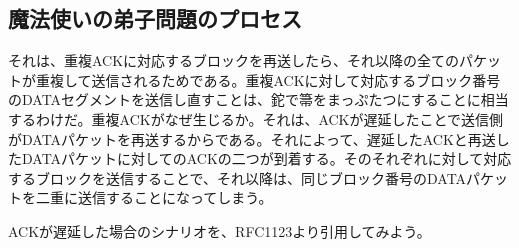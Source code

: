 \subsection{魔法使いの弟子問題のプロセス}

それは、重複ACKに対応するブロックを再送したら、それ以降の全てのパケットが重複して送信されるためである。重複ACKに対して対応するブロック番号のDATAセグメントを送信し直すことは、鉈で箒をまっぷたつにすることに相当するわけだ。重複ACKがなぜ生じるか。それは、ACKが遅延したことで送信側がDATAパケットを再送するからである。それによって、遅延したACKと再送したDATAパケットに対してのACKの二つが到着する。そのそれぞれに対して対応するブロックを送信することで、それ以降は、同じブロック番号のDATAパケットを二重に送信することになってしまう。

ACKが遅延した場合のシナリオを、RFC1123より引用してみよう。

